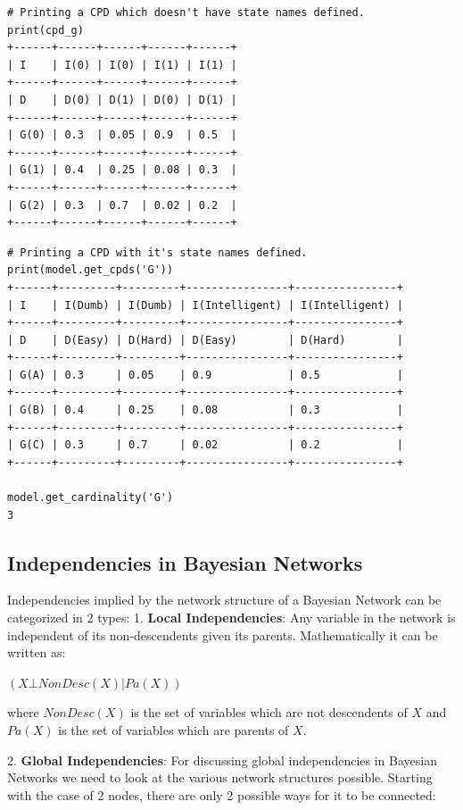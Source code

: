 \documentclass{article}
\begin{document}
\begin{verbatim}
# Printing a CPD which doesn't have state names defined.
print(cpd_g)
+------+------+------+------+------+
| I    | I(0) | I(0) | I(1) | I(1) |
+------+------+------+------+------+
| D    | D(0) | D(1) | D(0) | D(1) |
+------+------+------+------+------+
| G(0) | 0.3  | 0.05 | 0.9  | 0.5  |
+------+------+------+------+------+
| G(1) | 0.4  | 0.25 | 0.08 | 0.3  |
+------+------+------+------+------+
| G(2) | 0.3  | 0.7  | 0.02 | 0.2  |
+------+------+------+------+------+
\end{verbatim}

\begin{verbatim}
# Printing a CPD with it's state names defined.
print(model.get_cpds('G'))
+------+---------+---------+----------------+----------------+
| I    | I(Dumb) | I(Dumb) | I(Intelligent) | I(Intelligent) |
+------+---------+---------+----------------+----------------+
| D    | D(Easy) | D(Hard) | D(Easy)        | D(Hard)        |
+------+---------+---------+----------------+----------------+
| G(A) | 0.3     | 0.05    | 0.9            | 0.5            |
+------+---------+---------+----------------+----------------+
| G(B) | 0.4     | 0.25    | 0.08           | 0.3            |
+------+---------+---------+----------------+----------------+
| G(C) | 0.3     | 0.7     | 0.02           | 0.2            |
+------+---------+---------+----------------+----------------+

model.get_cardinality('G')
3
\end{verbatim}

\subsection{Independencies in Bayesian Networks}

Independencies implied by the network structure of a Bayesian Network can be categorized in 2 types: 1. \textbf{Local Independencies}: Any variable in the network is independent of its non-descendents given its parents. Mathematically it can be written as:

$(X \bot NonDesc(X) | Pa(X))$

where $ NonDesc(X) $ is the set of variables which are not descendents of $ X $ and $ Pa(X) $ is the set of variables which are parents of $ X $.

2. \textbf{Global Independencies}: For discussing global independencies in Bayesian Networks we need to look at the various network structures possible. Starting with the case of 2 nodes, there are only 2 possible ways for it to be connected:
\end{document}
